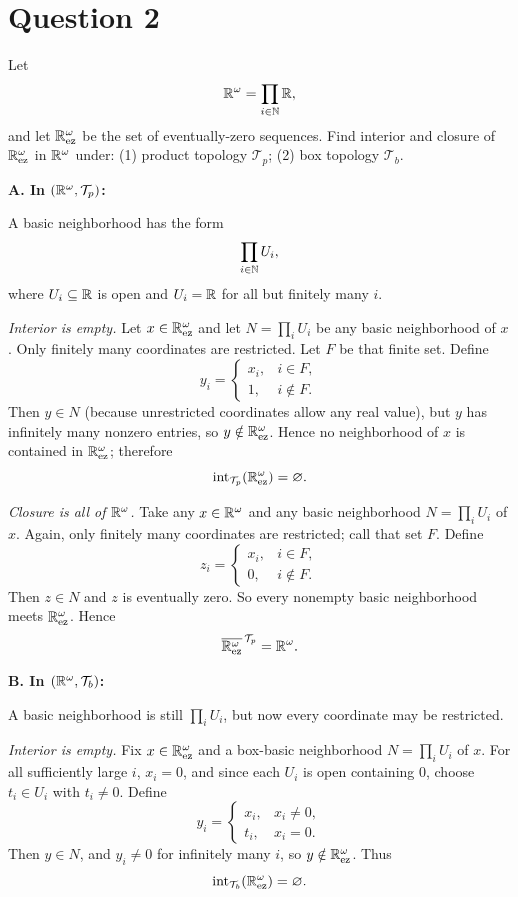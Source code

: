 \documentclass{article}
\begin{document}
\section{Question 2}

Let
\[
  \mathbb{R}^\omega=\prod_{i\in\mathbb{N}}\mathbb{R},
\]
and let $\mathbb{R}^\omega_{\mathrm{ez}}$ be the set of eventually-zero sequences.
Find interior and closure of $\mathbb{R}^\omega_{\mathrm{ez}}$ in $\mathbb{R}^\omega$ under:
(1) product topology $\mathcal{T}_p$;
(2) box topology $\mathcal{T}_b$.

\begin{solution}
  \textbf{A. In $(\mathbb{R}^\omega,\mathcal{T}_p)$:}

  A basic neighborhood has the form
  \[
    \prod_{i\in\mathbb{N}}U_i,
  \]
  where $U_i\subseteq\mathbb{R}$ is open and $U_i=\mathbb{R}$ for all but finitely many $i$.

  \emph{Interior is empty.}
  Let $x\in \mathbb{R}^\omega_{\mathrm{ez}}$ and let $N=\prod_i U_i$ be any
  basic neighborhood of $x$.
  Only finitely many coordinates are restricted. Let $F$ be that finite set.
  Define
  \[
    y_i=
    \begin{cases}
      x_i,& i\in F,\\
      1,& i\notin F.
    \end{cases}
  \]
  Then $y\in N$ (because unrestricted coordinates allow any real
  value), but $y$ has infinitely many nonzero entries, so $y\notin
  \mathbb{R}^\omega_{\mathrm{ez}}$.
  Hence no neighborhood of $x$ is contained in
  $\mathbb{R}^\omega_{\mathrm{ez}}$; therefore
  \[
    \operatorname{int}_{\mathcal{T}_p}(\mathbb{R}^\omega_{\mathrm{ez}})=\varnothing.
  \]

  \emph{Closure is all of $\mathbb{R}^\omega$.}
  Take any $x\in\mathbb{R}^\omega$ and any basic neighborhood $N=\prod_i U_i$ of $x$.
  Again, only finitely many coordinates are restricted; call that set $F$.
  Define
  \[
    z_i=
    \begin{cases}
      x_i,& i\in F,\\
      0,& i\notin F.
    \end{cases}
  \]
  Then $z\in N$ and $z$ is eventually zero.
  So every nonempty basic neighborhood meets $\mathbb{R}^\omega_{\mathrm{ez}}$.
  Hence
  \[
    \overline{\mathbb{R}^\omega_{\mathrm{ez}}}^{\,\mathcal{T}_p}=\mathbb{R}^\omega.
  \]

  \textbf{B. In $(\mathbb{R}^\omega,\mathcal{T}_b)$:}

  A basic neighborhood is still $\prod_i U_i$, but now every
  coordinate may be restricted.

  \emph{Interior is empty.}
  Fix $x\in\mathbb{R}^\omega_{\mathrm{ez}}$ and a box-basic neighborhood
  $N=\prod_i U_i$ of $x$.
  For all sufficiently large $i$, $x_i=0$, and since each $U_i$ is
  open containing $0$, choose $t_i\in U_i$ with $t_i\ne 0$.
  Define
  \[
    y_i=
    \begin{cases}
      x_i,& x_i\ne 0,\\
      t_i,& x_i=0.
    \end{cases}
  \]
  Then $y\in N$, and $y_i\ne 0$ for infinitely many $i$, so $y\notin
  \mathbb{R}^\omega_{\mathrm{ez}}$.
  Thus
  \[
    \operatorname{int}_{\mathcal{T}_b}(\mathbb{R}^\omega_{\mathrm{ez}})=\varnothing.
  \]


\end{solution}
\end{document}
